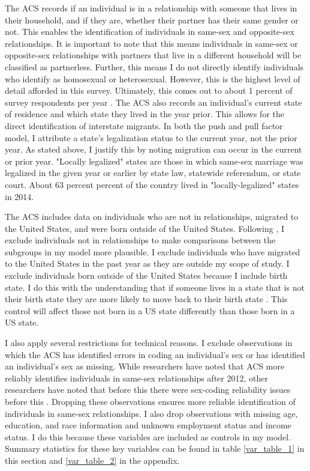 \documentclass[12pt,letterpaper]{article}
\begin{document}
The ACS records if an individual is in a relationship with someone that lives in their household, and if they are, whether their partner has their same gender or not. This enables the identification of individuals in same-sex and opposite-sex relationships. It is important to note that this means individuals in same-sex or opposite-sex relationships with partners that live in a different household will be classified as partnerless. Further, this means I do not directly identify individuals who identify as homosexual or heterosexual. However, this is the highest level of detail afforded in this survey. Ultimately, this comes out to about 1 percent of survey respondents per year \citep{28}. The ACS also records an individual’s current state of residence and which state they lived in the year prior. This allows for the direct identification of interstate migrants. In both the push and pull factor model, I attribute a state’s legalization status to the current year, not the prior year. As stated above, I justify this by noting migration can occur in the current or prior year. "Locally legalized" states are those in which same-sex marriage was legalized in the given year or earlier by state law, statewide referendum, or state court. About 63 percent percent of the country lived in "locally-legalized" states in 2014. 

\FloatBarrier



The ACS includes data on individuals who are not in relationships, migrated to the United States, and were born outside of the United States. Following \citet{1, 16}, I exclude individuals not in relationships to make comparisons between the subgroups in my model more plausible. I exclude individuals who have migrated to the United States in the past year as they are outside my scope of study. I exclude individuals born outside of the United States because I include birth state. I do this with the understanding that if someone lives in a state that is not their birth state they are more likely to move back to their birth state \citep{12}. This control will affect those not born in a US state differently than those born in a US state.

I also apply several restrictions for technical reasons. I exclude observations in which the ACS has identified errors in coding an individual’s sex or has identified an individual’s sex as missing. While researchers have noted that ACS more reliably identifies individuals in same-sex relationships after 2012, other researchers have noted that before this there were sex-coding reliability issues before this \citep{3, 5, 7, 12}. Dropping these observations ensures more reliable identification of individuals in same-sex relationships. I also drop observations with missing age, education, and race information and unknown employment status and income status. I do this because these variables are included as controls in my model. Summary statistics for these key variables can be found in table \ref{var_table_1} in this section and \ref{var_table_2} in the appendix.
\end{document}
